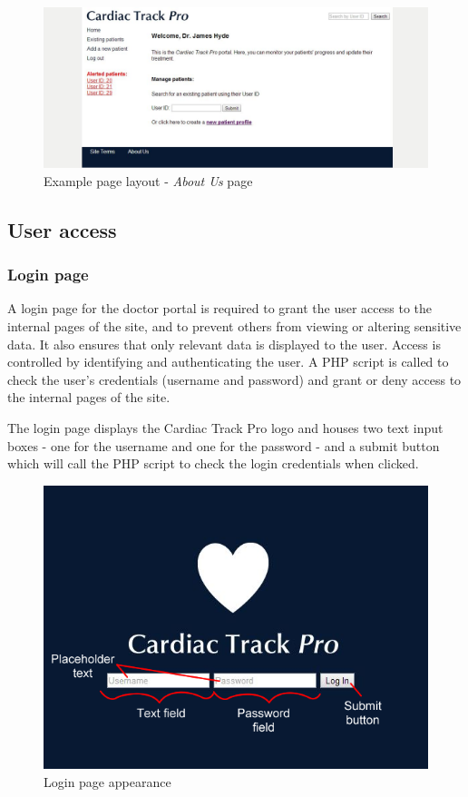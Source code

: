 \documentclass[11pt]{article}
\begin{document}
\begin{figure}[ht]
\begin{center}
\includegraphics[scale=0.5]{siteDesignGeneral}
\caption{Example page layout - \textit{About Us} page}
\label{fig:siteDesignGeneral}
\end{center}
\end{figure}

\subsection{User access}

\subsubsection{Login page}
A login page for the doctor portal is required to grant the user access to the internal pages of the site, and to prevent others from viewing or altering sensitive data. It also ensures that only relevant data is displayed to the user. Access is controlled by identifying and authenticating the user. A PHP script is called to check the user's credentials (username and password) and grant or deny access to the internal pages of the site.

The login page displays the Cardiac Track Pro logo and houses two text input boxes - one for the username and one for the password - and a submit button which will call the PHP script to check the login credentials when clicked.

\begin{figure}[ht]
\begin{center}
\includegraphics[scale=0.6]{login_design}
\end{center}
\caption{Login page appearance}
\label{fig:login_design}
\end{figure}
\end{document}

